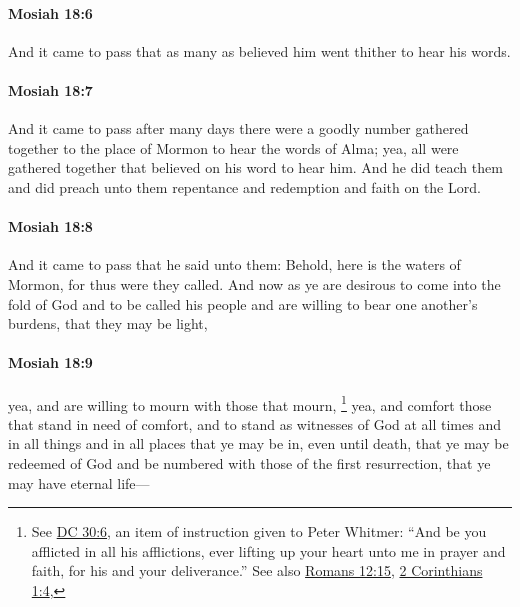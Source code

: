 		\paragraph{Mosiah 18:6} %
			\label{MOSIAH-18-6}

			And it came to pass that
			as many as believed him went thither to hear his words.

		\paragraph{Mosiah 18:7} %
			\label{MOSIAH-18-7}

			And it came to pass after many days
			there were a goodly number gathered together
			to the place of Mormon to hear the words of Alma;
			yea, all were gathered together that believed on his word to hear him.
			And he did teach them and did preach unto them
			repentance and redemption and faith on the Lord.

		\paragraph{Mosiah 18:8} %
			\label{MOSIAH-18-8}

			And it came to pass that he said unto them:
			Behold, here is the waters of Mormon,
			for thus were they called.
			And now as ye are desirous to come into the fold of God
			and to be called his people
			and are willing to bear one another's burdens,
			that they may be light,

		\paragraph{Mosiah 18:9} %
			\label{MOSIAH-18-9}

			yea, and are willing to mourn with those that mourn,%
				\footnote{%
					See \hyperref[DC30-6]{DC 30:6}, an item of instruction given to Peter Whitmer: ``And be you afflicted in all his afflictions, ever lifting up your heart unto me in prayer and faith, for his and your deliverance.'' See also \hyperref[ROMANS-12-15]{Romans 12:15}, \hyperref[2CORINTHIANS-1-4]{2 Corinthians 1:4}, 
					}
			yea, and comfort those that stand in need of comfort,
			and to stand as witnesses of God at all times and in all things
			and in all places that ye may be in,
			even until death,
			that ye may be redeemed of God
			and be numbered with those of the first resurrection,
			that ye may have eternal life---

